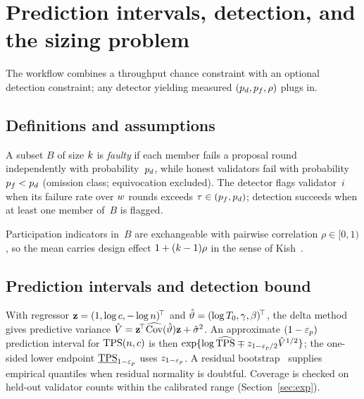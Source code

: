 \section{Prediction intervals, detection, and the sizing problem}
\label{sec:sizing}

The workflow combines a throughput chance constraint with an optional detection
constraint; any detector yielding measured $(p_{d},p_{f},\rho)$ plugs in.

\subsection{Definitions and assumptions}

\begin{Def}
\label{def:faults}
A subset $B$ of size $k$ is \emph{faulty} if each member fails a proposal
round independently with probability~$p_{d}$, while honest validators fail with
probability $p_{f}<p_{d}$ (omission class; equivocation excluded). The detector
flags validator~$i$ when its failure rate over $w$ rounds exceeds
$\tau\in(p_{f},p_{d})$; detection succeeds when at least one member of~$B$ is
flagged.
\end{Def}

\begin{Assumption}
\label{as:rho}
Participation indicators in~$B$ are exchangeable with pairwise correlation
$\rho\in[0,1)$, so the mean carries design effect $1+(k-1)\rho$ in the sense
of Kish~\cite{kish1965}.
\end{Assumption}

\subsection{Prediction intervals and detection bound}
\label{sec:detection}

With regressor $\mathbf{z}=(1,\log c,-\log n)^{\!\top}$ and
$\hat\vartheta=(\log T_{0},\gamma,\beta)^{\!\top}$, the delta
method~\cite{seber2003} gives predictive variance
$\hat{V}=\mathbf{z}^{\!\top}\widehat{\mathrm{Cov}}(\hat\vartheta)\mathbf{z}+\hat\sigma^{2}$.
An approximate $(1-\varepsilon_{p})$ prediction interval for $\mathrm{TPS}(n,c)$ is then
$\exp\{\log\widehat{\mathrm{TPS}}\mp z_{1-\varepsilon_{p}/2}\hat{V}^{1/2}\}$;\label{st:pi}
the one-sided lower endpoint $\underline{\mathrm{TPS}}_{1-\varepsilon_{p}}$ uses $z_{1-\varepsilon_{p}}$.
A residual bootstrap~\cite{efron1993} supplies empirical quantiles when residual
normality is doubtful. Coverage is checked on held-out validator counts within
the calibrated range (Section~\ref{sec:exp}).

